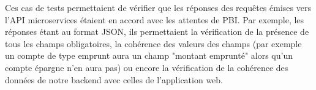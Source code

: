 	Ces cas de tests permettaient de vérifier que les réponses des requêtes émises vers l'API microservices étaient en accord avec les attentes de PBI. Par exemple, les réponses étant au format JSON, ils permettaient la vérification de la présence de tous les champs obligatoires, la cohérence des valeurs des champs (par exemple un compte de type emprunt aura un champ "montant emprunté" alors qu'un compte épargne n'en aura pas) ou encore la vérification de la cohérence des données de notre backend avec celles de l'application web.
